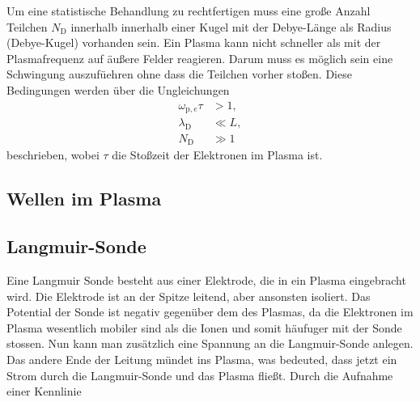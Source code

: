 Um eine statistische Behandlung zu rechtfertigen muss eine gro\ss e Anzahl Teilchen $N_\text{D}$ innerhalb innerhalb einer Kugel mit der Debye-L\"ange als Radius (Debye-Kugel) vorhanden sein.
Ein Plasma kann nicht schneller als mit der Plasmafrequenz auf \"au\ss ere Felder reagieren.
Darum muss es m\"oglich sein eine Schwingung auszuf\"uehren ohne dass die Teilchen vorher sto\ss en.
Diese Bedingungen werden \"uber die Ungleichungen
\begin{align}
\omega_{\text{p},e}\tau
&>1,
\label{eq:c1}\\
\lambda_\text{D}
&\ll L,
\label{eq:c2}\\
N_\text{D}
&\gg 1
\label{eq:c3}
\end{align}
beschrieben, wobei $\tau$ die Sto\ss zeit der Elektronen im Plasma ist.
\cite{stroth11a}

\subsection{Wellen im Plasma}




\subsection{Langmuir-Sonde}
Eine Langmuir Sonde besteht aus einer Elektrode, die in ein Plasma eingebracht wird.
Die Elektrode ist an der Spitze leitend, aber ansonsten isoliert.
Das Potential der Sonde ist negativ gegen\"uber dem des Plasmas, da die Elektronen im Plasma wesentlich mobiler sind als die Ionen und somit h\"aufuger mit der Sonde stossen.
Nun kann man zus\"atzlich eine Spannung an die Langmuir-Sonde anlegen.
Das andere Ende der Leitung m\"undet ins Plasma, was bedeuted, dass jetzt ein Strom durch die Langmuir-Sonde und das Plasma flie\ss t.
Durch die Aufnahme einer Kennlinie
\cite{anleitung1}

